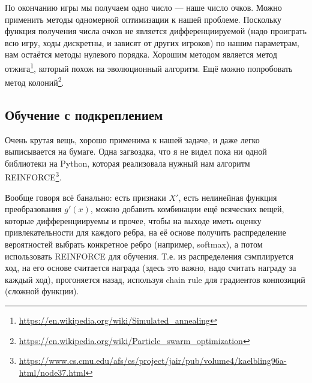 \documentclass[14pt,a4paper]{article}
\begin{document}
По окончанию игры мы получаем одно число --- наше число очков.
Можно применить методы одномерной оптимизации к нашей проблеме.
Поскольку функция получения числа очков не является дифференциируемой (надо проиграть всю игру, ходы дискретны, и зависят от других игроков) по нашим параметрам, нам остаётся методы нулевого порядка.
Хорошим методом является метод отжига\footnote{\url{https://en.wikipedia.org/wiki/Simulated_annealing}}, который похож на эволюционный алгоритм.
Ещё можно попробовать метод колоний\footnote{\url{https://en.wikipedia.org/wiki/Particle_swarm_optimization}}.

\subsection{Обучение с подкреплением}

Очень крутая вещь, хорошо применима к нашей задаче, и даже легко выписывается на бумаге.
Одна загвоздка, что я не видел пока ни одной библиотеки на Python, которая реализовала нужный нам алгоритм REINFORCE\footnote{\url{https://www.cs.cmu.edu/afs/cs/project/jair/pub/volume4/kaelbling96a-html/node37.html}}.

Вообще говоря всё банально: есть признаки $ X' $, есть нелинейная функция преобразования $ g'(x) $, можно добавить комбинации ещё всяческих вещей, которые дифференциируемы и прочее, чтобы на выходе иметь оценку привлекательности для каждого ребра, на её основе получить распределение вероятностей выбрать конкретное ребро (например, softmax), а потом использовать REINFORCE для обучения.
Т.е. из распределения сэмплируется ход, на его основе считается награда (здесь это важно, надо считать награду за каждый ход), прогоняется назад, используя chain rule для градиентов конпозиций (сложной функции).
\end{document}

